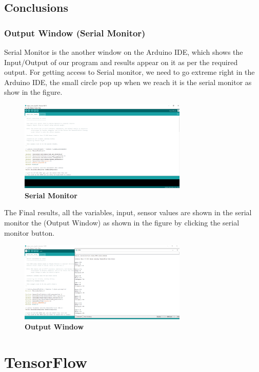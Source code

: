 \subsection{Conclusions}
\subsubsection{Output Window (Serial Monitor)}
Serial Monitor is the another window on the Arduino IDE, which shows the Input/Output of our program and results appear on it as per the required output. For getting
access to Serial monitor, we need to go extreme right in the Arduino IDE, the small
circle pop up when we reach it is the serial monitor as show in the figure.

\begin{figure}[H]\centering
	\includegraphics[width=8cm]{Images/software/SerialMonitor}
	\caption{\textbf{Serial Monitor}}
	\label{fig:SerialMonitor}		
\end{figure}
 
The Final results, all the variables, input, sensor values are shown in the serial monitor
the (Output Window) as shown in the figure by clicking the serial monitor button.

\begin{figure}[H]\centering
	\includegraphics[width=8cm]{Images/software/OutputWindow}
	\caption{\textbf{Output Window}}
	\label{fig:OutputWindow}		
\end{figure}

\section{TensorFlow}
\label{TensorFlow}

